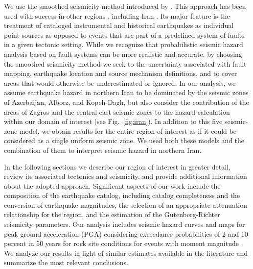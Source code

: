  We use the smoothed seismicity method introduced by \citet{Frankel1995}. This approach has been used with success in other regions \citep[e.g.][]{Cao1996, Akinci2004, Kalkan2009}, including Iran \citep{Khodaverdian_2016_BSSA}. Its major feature is the treatment of cataloged instrumental and historical earthquakes as individual point sources as opposed to events that are part of a predefined system of faults in a given tectonic setting. While we recognize that probabilistic seismic hazard analysis based on fault systems can be more realistic and accurate, by choosing the smoothed seismicity method we seek to  the uncertainty associated with fault mapping, earthquake location and source mechanism definitions, and to cover areas that would otherwise be underestimated or ignored. In our analysis, we assume earthquake hazard in northern Iran to be dominated by the seismic zones of Azerbaijan, Alborz, and Kopeh-Dagh, but also consider the contribution of the areas of Zagros and the central-east seismic zones to the hazard calculation within our domain of interest (see Fig.~\ref{fig:iran}). In addition to this five seismic-zone model, we obtain results for the entire region of interest as if it could be considered as a single uniform seismic zone. We used both these models and the combination of them to interpret seismic hazard in northern Iran.

In the following sections we describe our region of interest in greater detail, review its associated tectonics and seismicity, and provide additional information about the adopted approach. Significant aspects of our work include the composition of the earthquake catalog, including catalog completeness and the conversion of earthquake magnitudes, the selection of an appropriate attenuation relationship for the region, and the estimation of the Gutenberg-Richter seismicity parameters. Our analysis includes seismic hazard curves and maps for peak ground acceleration (PGA) considering exceedance probabilities of 2 and 10 percent in 50 years for rock site conditions for events with moment magnitude . We analyze our results in light of similar estimates available in the literature and summarize the most relevant conclusions.

